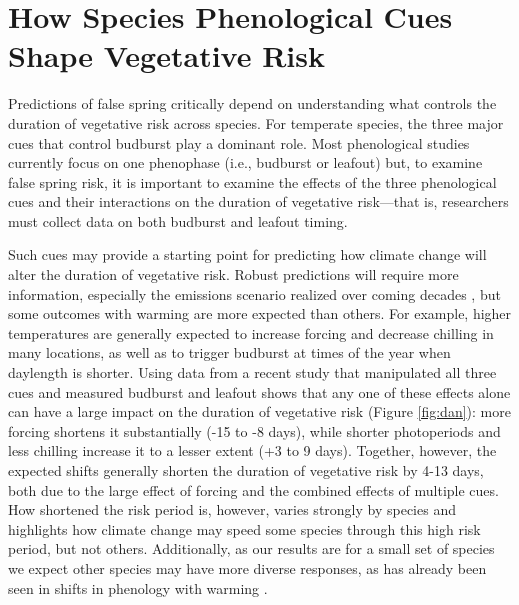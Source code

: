 \documentclass{article}\usepackage[]{graphicx}\usepackage[]{color}
\begin{document}
\section* {How Species Phenological Cues Shape Vegetative Risk}
Predictions of false spring critically depend on understanding what controls the duration of vegetative risk across species. For temperate species, the three major cues that control budburst \citep[e.g., low winter temperatures, warm spring temperatures, and increasing photoperiods,][]
{Chuine2010} play a dominant role. Most phenological studies currently focus on one phenophase (i.e., budburst or leafout) but, to examine false spring risk, it is important to examine the effects of the three phenological cues and their interactions on the duration of vegetative risk---that is, researchers must collect data on both budburst and leafout timing.  

Such cues may provide a starting point for predicting how climate change will alter the duration of vegetative risk. Robust predictions will require more information, especially the emissions scenario realized over coming decades \citep{IPCC2014}, but some outcomes with warming are more expected than others. For example, higher temperatures are generally expected to increase forcing and decrease chilling in many locations, as well as to trigger budburst at times of the year when daylength is shorter. Using data from a recent study that manipulated all three cues and measured budburst and leafout \citep{Flynn2018} shows that any one of these effects alone can have a large impact on the duration of vegetative risk (Figure \ref{fig:dan}): more forcing shortens it substantially (-15 to -8 days), while shorter photoperiods and less chilling increase it to a lesser extent (+3 to 9 days). Together, however, the expected shifts generally shorten the duration of vegetative risk by 4-13 days, both due to the large effect of forcing and the combined effects of multiple cues. How shortened the risk period is, however, varies strongly by species and highlights how climate change may speed some species through this high risk period, but not others. Additionally, as our results are for a small set of species we expect other species may have more diverse responses, as has already been seen in shifts in phenology with warming \citep{Cleland2006, Fu2015, Xin2016}.
\end{document}
